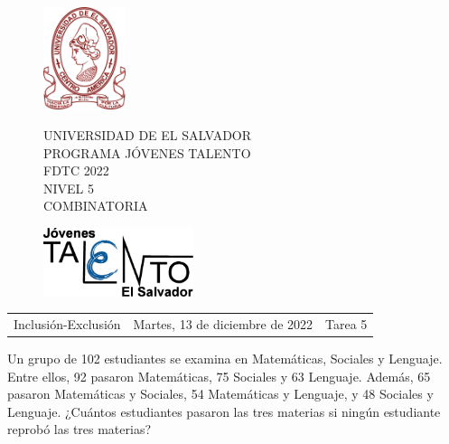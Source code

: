 \documentclass[12pt]{article}
\newcommand{\tema}{Inclusión-Exclusión}
\newcommand{\fecha}{Martes, 13 de diciembre de 2022}
\newcommand{\sesion}{Tarea 5}
\begin{document}
\thispagestyle{empty}

\begin{figure}[h] 
	\begin{minipage}[b]{0.26\textwidth}
		\begin{center}
			\includegraphics[height=3cm]{Logos/UES.png}
			\par\end{center}
	\end{minipage} 
	\begin{minipage}[b]{0.46\textwidth}
		\begin{center}
			UNIVERSIDAD DE EL SALVADOR\\ [0.1cm]
			PROGRAMA JÓVENES TALENTO\\ [0.1cm]
	        FDTC 2022\\ [0.1cm]
                NIVEL 5\\ [0.1cm]
			COMBINATORIA 
			\par\end{center}
	\end{minipage} 
	\begin{minipage}[b]{0.05\textwidth}
		\begin{center}
			\includegraphics[height=2cm]{Logos/LOGO PJT.png}
			\par\end{center}
	\end{minipage}
\end{figure}

\begin{center}
    \begin{tabular}{p{4.5cm} p{7cm} p{4.5cm}}
        \tema & \centering\fecha & \hfill\sesion
    \end{tabular}
\end{center}

\begin{problema}
    Un grupo de 102 estudiantes se examina en Matemáticas, Sociales y Lenguaje. Entre ellos, 92 pasaron Matemáticas, 75 Sociales y 63 Lenguaje. Además, 65 pasaron Matemáticas y Sociales, 54 Matemáticas y Lenguaje, y 48 Sociales y Lenguaje. ¿Cuántos estudiantes pasaron las tres materias si ningún estudiante reprobó las tres materias?
\end{problema}
\end{document}

